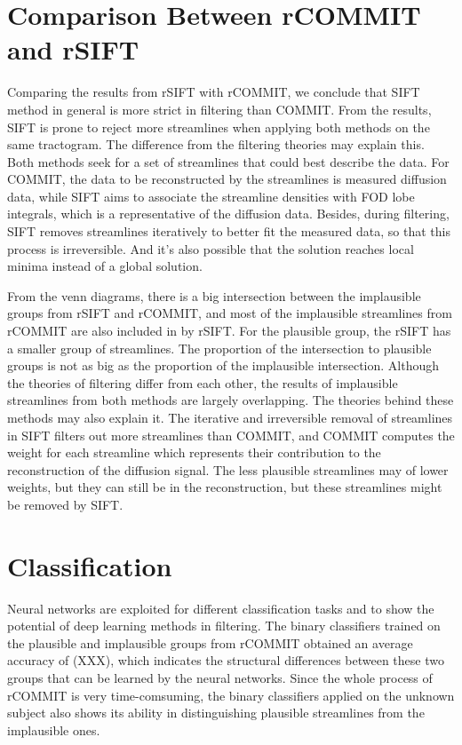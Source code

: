 \section{Comparison Between rCOMMIT and rSIFT}

Comparing the results from rSIFT with rCOMMIT, we conclude that SIFT method in general is more strict in filtering than COMMIT. From the results, SIFT 
is prone to reject more streamlines when applying both methods on the same tractogram.  
The difference from the filtering theories may explain this. 
Both methods seek for a set of streamlines that could best describe the data. For COMMIT, the data to be reconstructed by the streamlines is measured diffusion data, while 
SIFT aims to associate the streamline densities with FOD lobe integrals, which is a representative of the diffusion data. Besides,
during filtering, SIFT removes streamlines iteratively to better fit the measured data, so that this process is irreversible. And it's 
also possible that the solution reaches local minima instead of a global solution.


From the venn diagrams, there is a big intersection between the implausible groups from rSIFT and rCOMMIT, 
and most of the implausible streamlines from rCOMMIT are also included in by rSIFT. For the plausible 
group, the rSIFT has a smaller group of streamlines. The proportion of the intersection to plausible groups is not 
as big as the proportion of the implausible intersection. Although the theories of filtering differ from each other,
the results of implausible streamlines from both methods are largely overlapping. 
The theories behind these methods may also explain it. The iterative and irreversible removal of streamlines in SIFT filters out more streamlines than COMMIT,
and COMMIT computes the weight for each streamline which represents their contribution to the reconstruction of the diffusion signal. 
The less plausible streamlines may of lower weights, but they can still be in the reconstruction, but these streamlines might be removed by SIFT.


\section{Classification}

Neural networks are exploited for different classification tasks and to show the potential of deep learning methods in filtering.
The binary classifiers trained on the plausible and implausible groups from rCOMMIT obtained an average accuracy of (XXX), which indicates the 
structural differences between these two groups that can be learned by the neural networks. Since the whole process of rCOMMIT is very time-comsuming,
the binary classifiers applied on the unknown subject also shows its ability in distinguishing plausible streamlines from the implausible ones.


